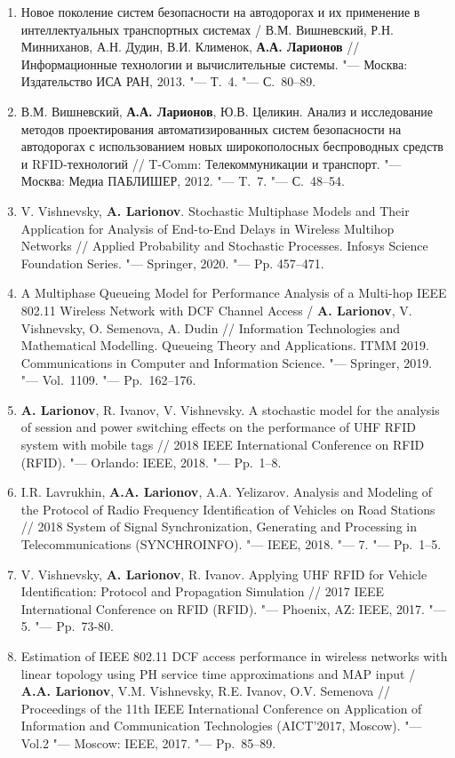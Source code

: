 \begin{frame}
\begin{enumerate}
        \item Новое поколение систем безопасности на автодорогах и их применение в интеллектуальных транспортных системах / В.М. Вишневский, Р.Н. Минниханов, А.Н. Дудин, В.И. Клименок, \textbf{А.А. Ларионов} // Информационные технологии и вычислительные системы. "--- Москва: Издательство ИСА РАН, 2013. "--- Т.~4. "--- С.~80--89.
        \item В.М. Вишневский, \textbf{А.А. Ларионов}, Ю.В. Целикин. Анализ и исследование методов проектирования автоматизированных систем безопасности на автодорогах с использованием новых широкополосных беспроводных средств и RFID-технологий // T-Comm: Телекоммуникации и транспорт. "--- Москва: Медиа ПАБЛИШЕР, 2012. "--- T.~7. "--- С.~48--54.
        \item V. Vishnevsky, \textbf{A. Larionov}. Stochastic Multiphase Models and Their Application for Analysis of End-to-End Delays in Wireless Multihop Networks // Applied Probability and Stochastic Processes. Infosys Science Foundation Series. "--- Springer, 2020. "--- Pp. 457--471.
        \item A Multiphase Queueing Model for Performance Analysis of a Multi-hop IEEE 802.11 Wireless Network with DCF Channel Access / \textbf{A. Larionov}, V. Vishnevsky, O. Semenova, A. Dudin // Information Technologies and Mathematical Modelling. Queueing Theory and Applications. ITMM 2019. Communications in Computer and Information Science. "--- Springer, 2019. "--- Vol.~1109. "--- Pp.~162--176.
        \item \textbf{A. Larionov}, R. Ivanov, V. Vishnevsky. A stochastic model for the analysis of session and power switching effects on the performance of UHF RFID system with mobile tags // 2018 IEEE International Conference on RFID (RFID). "--- Orlando: IEEE, 2018. "--- Pp.~1--8.
        \item I.R. Lavrukhin, \textbf{A.A. Larionov}, A.A. Yelizarov. Analysis and Modeling of the Protocol of Radio Frequency Identification of Vehicles on Road Stations // 2018 System of Signal Synchronization, Generating and Processing in Telecommunications (SYNCHROINFO). "--- IEEE, 2018. "--- 7. "--- Pp.~1--5.
        \item V. Vishnevsky, \textbf{A. Larionov}, R. Ivanov. Applying UHF RFID for Vehicle Identification: Protocol and Propagation Simulation // 2017 IEEE International Conference on RFID (RFID). "--- Phoenix, AZ: IEEE, 2017. "--- 5. "--- Pp.~73-80.
        \item Estimation of IEEE 802.11 DCF access performance in wireless networks with linear topology using PH service time approximations and MAP input / \textbf{A.A. Larionov}, V.M. Vishnevsky, R.E. Ivanov, O.V. Semenova // Proceedings of the 11th IEEE International Conference on Application of Information and Communication Technologies (AICT'2017, Moscow). "--- Vol.2 "--- Moscow: IEEE, 2017. "--- Pp.~85--89.

\end{enumerate}
\end{frame}
